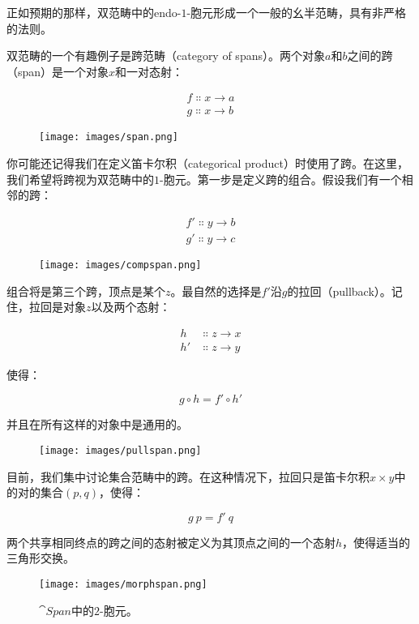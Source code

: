 正如预期的那样，双范畴中的endo-$1$-胞元形成一个一般的幺半范畴，具有非严格的法则。

双范畴的一个有趣例子是跨范畴（category of spans）。两个对象$a$和$b$之间的跨（span）是一个对象$x$和一对态射：

\begin{gather*}
  f \Colon x \to a \\
  g \Colon x \to b
\end{gather*}

\begin{figure}[H]
  \centering
  \texttt{[image: images/span.png]}
\end{figure}

\noindent
你可能还记得我们在定义笛卡尔积（categorical product）时使用了跨。在这里，我们希望将跨视为双范畴中的$1$-胞元。第一步是定义跨的组合。假设我们有一个相邻的跨：

\begin{gather*}
  f' \Colon y \to b \\
  g' \Colon y \to c
\end{gather*}

\begin{figure}[H]
  \centering
  \texttt{[image: images/compspan.png]}
\end{figure}

\noindent
组合将是第三个跨，顶点是某个$z$。最自然的选择是$f'$沿$g$的拉回（pullback）。记住，拉回是对象$z$以及两个态射：

\begin{align*}
  h  & \Colon z \to x \\
  h' & \Colon z \to y
\end{align*}

使得：

$$g \circ h = f' \circ h'$$

并且在所有这样的对象中是通用的。

\begin{figure}[H]
  \centering
  \texttt{[image: images/pullspan.png]}
\end{figure}

\noindent
目前，我们集中讨论集合范畴中的跨。在这种情况下，拉回只是笛卡尔积$x \times y$中的对的集合$(p, q)$，使得：

$$g\ p = f'\ q$$

两个共享相同终点的跨之间的态射被定义为其顶点之间的一个态射$h$，使得适当的三角形交换。

\begin{figure}[H]
  \centering
  \texttt{[image: images/morphspan.png]}
  \caption{$\cat{Span}$中的$2$-胞元。}
\end{figure}

